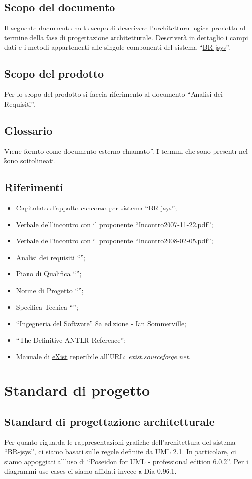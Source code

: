 \section{Scopo del documento}
Il seguente documento ha lo scopo di descrivere l'architettura logica prodotta al termine della fase di progettazione architetturale. Descriver\`a in dettaglio i campi dati e i metodi appartenenti alle singole componenti del sistema ``\underline{BR-jsys}''.
\section{Scopo del prodotto}
Per lo scopo del prodotto si faccia riferimento al documento ``Analisi dei Requisiti''.

\section{Glossario}
Viene fornito come documento esterno chiamato \G. I termini che sono presenti nel \G sono sottolineati.

\section{Riferimenti}
\begin{itemize}
\item Capitolato d'appalto concorso per sistema ``\underline{BR-jsys}'';
\item Verbale dell'incontro con il proponente ``Incontro2007-11-22.pdf'';
\item Verbale dell'incontro con il proponente ``Incontro2008-02-05.pdf'';
\item Analisi dei requisiti ``\AR'';
\item Piano di Qualifica ``\PdQ'';
\item Norme di Progetto ``\NdP'';
\item Specifica Tecnica ``\ST'';
\item ``Ingegneria del Software'' 8a edizione - Ian Sommerville;
\item ``The Definitive ANTLR Reference'';
\item Manuale di \underline{eXist} reperibile all'URL: \textit{exist.sourceforge.net}.
\end{itemize}
\chapter{Standard di progetto}
\section{Standard di progettazione architetturale}
Per quanto riguarda le rappresentazioni grafiche dell'architettura del sistema ``\underline{BR-jsys}'', ci siamo basati sulle regole definite da \underline{UML} 2.1. In particolare, ci siamo appoggiati all'uso di ``Poseidon for \underline{UML} - professional edition 6.0.2''. Per i diagrammi use-cases ci siamo affidati invece a Dia 0.96.1.

